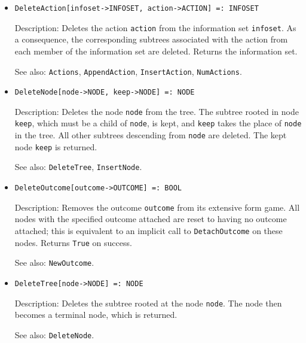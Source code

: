 \begin{itemize}

\item
\protect \large \begin{verbatim}
DeleteAction[infoset->INFOSET, action->ACTION] =: INFOSET
\end{verbatim}\normalsize

\bd
\item
[Description:] Deletes the action \verb+action+ from the information set
\verb+infoset+.  As a consequence, the corresponding subtrees associated
with the action from each member of the information set are deleted.
Returns the information set.
\item
[See also:] {\tt Actions}, {\tt AppendAction}, {\tt InsertAction},
{\tt NumActions}.
\ed

\item
\protect \large \begin{verbatim}
DeleteNode[node->NODE, keep->NODE] =: NODE
\end{verbatim}\normalsize

\bd
\item   
[Description:] Deletes the node \verb+node+ from the tree.  The
subtree rooted in node \verb+keep+, which must be a child of
\verb+node+, is kept, and \verb+keep+ takes the place of \verb+node+ in
the tree.  All other subtrees descending from \verb+node+ are deleted.
The kept node \verb+keep+ is returned.
\item
[See also:] {\tt DeleteTree}, {\tt InsertNode}.
\ed

\item
\protect \large \begin{verbatim}
DeleteOutcome[outcome->OUTCOME] =: BOOL
\end{verbatim}\normalsize

\bd
\item
[Description:] Removes the outcome \verb+outcome+ from its extensive
form game.  All nodes with the specified outcome attached are reset to
having no outcome attached; this is equivalent to an implicit call to
{\tt DetachOutcome} on these nodes.  Returns \verb+True+ on success.
\item
[See also:] {\tt NewOutcome}.
\ed

\item
\protect \large \begin{verbatim}
DeleteTree[node->NODE] =: NODE
\end{verbatim}\normalsize

\bd
\item
[Description:] Deletes the subtree rooted at the node \verb+node+.  The
node then becomes a terminal node, which is returned.
\item
[See also:] {\tt DeleteNode}.
\ed


\end{itemize}
